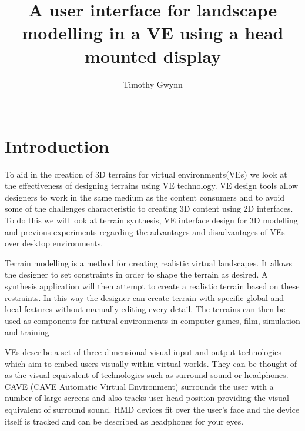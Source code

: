 \documentclass{sig-alternate-05-2015}
\begin{document}
\title{A user interface for landscape modelling in a VE using a head mounted display}

\author{
\alignauthor
Timothy Gwynn\\
       \\
}
\maketitle
\begin{CCSXML}

\end{CCSXML}



\printccsdesc
{}

\section{Introduction}
To aid in the creation of 3D terrains for virtual environments(VEs) we look at the effectiveness of designing terrains using VE technology. VE design tools allow designers to work in the same medium as the content consumers and to avoid some of the challenges characteristic to creating 3D content using 2D interfaces. To do this we will look at terrain synthesis, VE interface design for 3D modelling and previous experiments regarding the advantages and disadvantages of VEs over desktop environments.

Terrain modelling is a method for creating realistic virtual landscapes. It allows the designer to set constraints in order to shape the terrain as desired. A synthesis application will then attempt to create a realistic terrain based on these restraints. In this way the designer can create terrain with specific global and local features without manually editing every detail. The terrains can then be used as components for natural environments in computer games, film, simulation and training\cite{Gain2015}

VEs describe a set of three dimensional visual input and output technologies which aim to embed users visually within virtual worlds. They can be thought of as the visual equivalent of technologies such as surround sound or headphones. CAVE (CAVE Automatic Virtual
Environment) surrounds the user with a number of large screens and also tracks user head position\cite{Cruz-Neira1993} providing the visual equivalent of surround sound. HMD devices fit over the user's face and the device itself is tracked and can be described as headphones for your eyes.\cite{alger2015visual}
\end{document}
